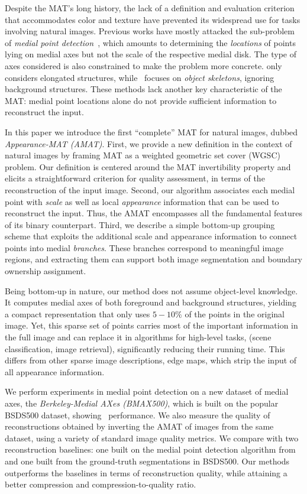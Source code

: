 \documentclass[10pt,twocolumn,letterpaper]{article}
\begin{document}
Despite the MAT's long history, the lack of a definition and evaluation criterion 
that accommodates color and texture have prevented its widespread use for tasks involving natural images.
Previous works have mostly attacked the sub-problem of \emph{medial point detection}~\cite{tsogkas2012learning,shen2016object},
which amounts to determining the \emph{locations} of points lying on medial axes 
but not the scale of the respective medial disk.
The type of axes considered is also constrained to make the problem more concrete.
\cite{tsogkas2012learning} only considers elongated structures, while~\cite{shen2016object} 
focuses on \emph{object skeletons}, ignoring background structures.
These methods lack another key characteristic of the MAT: medial point locations alone do not provide sufficient
information to reconstruct the input.

In this paper we introduce the first ``complete'' MAT for natural images, dubbed \emph{Appearance-MAT (AMAT)}.
First, we provide a new definition in the context of natural images by framing MAT 
as a weighted geometric set cover (WGSC) problem.
Our definition is centered around the MAT invertibility property and elicits 
a straightforward criterion for quality assessment, in terms of the reconstruction of the input image.
Second, our algorithm associates each medial point with \emph{scale} as well as local \emph{appearance} information
that can be used to reconstruct the input.
Thus, the AMAT encompasses all the fundamental features of its  binary counterpart. 
Third, we describe a simple bottom-up grouping scheme that exploits the additional scale and appearance information to connect
points into medial \emph{branches}.
These branches correspond to meaningful image regions, and extracting them can support both image segmentation
and boundary ownership assignment.

Being bottom-up in nature, our method does not assume object-level knowledge.
It computes medial axes of both foreground and background structures, 
yielding a compact representation that only uses $5-10\%$ of the points in the original image.
Yet, this sparse set of points carries most of the important information in the full image
and can replace it in algorithms for high-level tasks, 
(scene classification, image retrieval), significantly reducing their running time.
This differs from other sparse image descriptions, \eg edge maps, which strip the input of all appearance information.

We perform experiments in medial point detection on a new dataset of medial axes, the 
\emph{Berkeley-Medial AXes (BMAX500)}, which is built on the popular BSDS500 dataset, showing \sota\ performance.
We also measure the quality of reconstructions  obtained by inverting the AMAT of images from the same dataset, 
using  a variety of standard image quality metrics.
We compare with two reconstruction baselines: one built on the medial point detection algorithm from~\cite{tsogkas2012learning}
and one built from the ground-truth segmentations in BSDS500.
Our methods outperforms the baselines in terms of reconstruction quality, while attaining a better compression and
compression-to-quality ratio.
\end{document}
